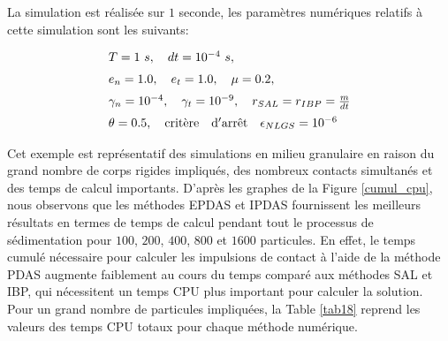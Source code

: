 \noindent La simulation est réalisée sur $ 1 $ seconde, les paramètres numériques relatifs à cette simulation sont les suivants:

\begin{eqnarray*}
	\begin{array}{l}
	    T = 1\ s,\quad dt = 10^{-4}\ s, \nonumber \\[2mm]
		e_n = 1.0,\quad e_t = 1.0,\quad \mu = 0.2, \nonumber \\[2mm]
		\gamma_n = 10^{-4},\quad \gamma_t = 10^{-9}, \quad r_{SAL} = r_{IBP} = \frac{m}{dt} \nonumber  \\[2mm]
		\theta = 0.5,\quad {\rm crit\grave{e}re \quad d'arr\hat{e}t} \quad \epsilon_{NLGS} = 10^{-6}
	\end{array}
\end{eqnarray*}

Cet exemple est représentatif des simulations en milieu granulaire en raison du grand nombre de corps rigides impliqués, des nombreux contacts simultanés et des temps de calcul importants. D'après les graphes de la Figure \ref{cumul_cpu}, nous observons que les méthodes EPDAS et IPDAS fournissent les meilleurs résultats en termes de temps de calcul pendant tout le processus de sédimentation pour $ 100 $, $200 $, $400 $, $800 $ et $1600 $ particules. En effet, le temps cumulé nécessaire pour calculer les impulsions de contact à l'aide de la méthode PDAS augmente faiblement au cours du temps comparé aux méthodes SAL et IBP, qui nécessitent un temps CPU plus important pour calculer la solution. Pour un grand nombre de particules impliquées, la Table \ref{tab18} reprend les valeurs des temps CPU totaux pour chaque méthode numérique.\\


